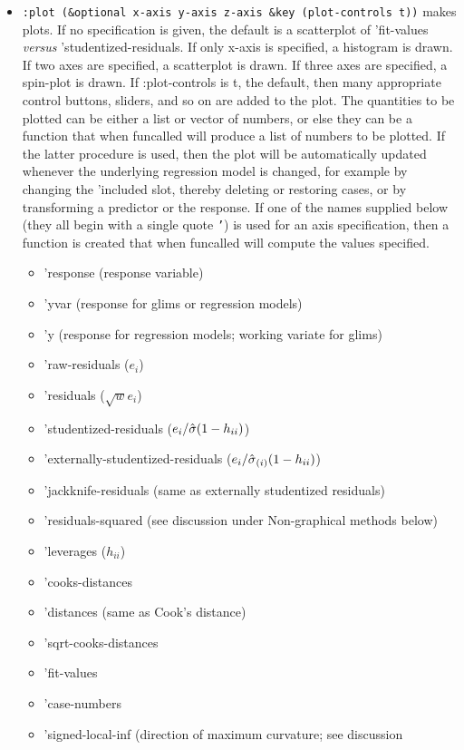 \begin{itemize}
\item {\tt :plot (\&optional x-axis y-axis z-axis \&key (plot-controls t))}
makes plots.  If no specification is given, the default is a scatterplot 
of 'fit-values 
{\sl versus} 'studentized-residuals.  If only x-axis is specified, a histogram 
is drawn.  If two axes are specified, a scatterplot is drawn.  
If three axes are specified, a spin-plot is drawn.  
If :plot-controls is t, the default, then many appropriate control buttons, 
sliders, and so on are added to the plot. The quantities to be plotted can be 
either a list or vector of numbers, or else they can be a function 
that when funcalled will produce a list of numbers to be plotted.  If
the latter procedure is used, then the plot will be automatically updated
whenever the underlying regression model is changed, for example by changing
the 'included slot, thereby deleting or restoring cases,
or by transforming a predictor or the response.
If one of the names supplied below (they all begin with a 
single quote {\tt '}) is used for an axis specification, then a function is 
created that when funcalled will compute the values specified. 
	\begin{itemize}
   \item 'response (response variable)
	\item 'yvar (response for glims or regression models)
	\item 'y (response for regression models; working variate for glims)
	\item 'raw-residuals ($e_i$)
	\item 'residuals ($\sqrt{w}e_i$)
	\item 'studentized-residuals ($e_i/\mbox{$\hat{\sigma}$} (1-h_{ii})$)
	\item 'externally-studentized-residuals ($e_i/\mbox{$\hat{\sigma}$} _{(i)}(1-h_{ii})$)
	\item 'jackknife-residuals (same as externally studentized residuals)
	\item 'residuals-squared (see discussion under Non-graphical methods below)
	\item 'leverages ($h_{ii}$)
	\item 'cooks-distances 
	\item 'distances (same as Cook's distance)
	\item 'sqrt-cooks-distances
	\item 'fit-values 
	\item 'case-numbers 
	\item 'signed-local-inf (direction of maximum curvature; see discussion

\end{itemize}
\end{itemize}
